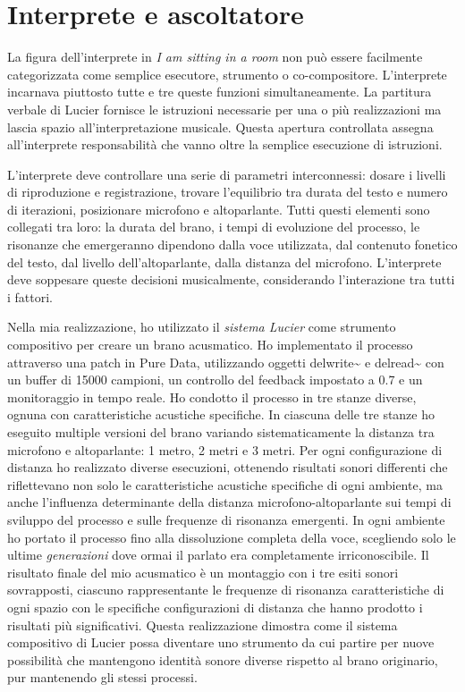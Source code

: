 
\section{Interprete e ascoltatore}
La figura dell'interprete in \textit{I am sitting in a room} non può essere facilmente categorizzata come semplice esecutore, strumento o co-compositore. L'interprete incarnava piuttosto tutte e tre queste funzioni simultaneamente. La partitura verbale di Lucier fornisce le istruzioni necessarie per una o più realizzazioni ma lascia spazio all'interpretazione musicale. Questa apertura controllata assegna all'interprete responsabilità che vanno oltre la semplice esecuzione di istruzioni.

L'interprete deve controllare una serie di parametri interconnessi: dosare i livelli di riproduzione e registrazione, trovare l'equilibrio tra durata del testo e numero di iterazioni, posizionare microfono e altoparlante. Tutti questi elementi sono collegati tra loro: la durata del brano, i tempi di evoluzione del processo, le risonanze che emergeranno dipendono dalla voce utilizzata, dal contenuto fonetico del testo, dal livello dell'altoparlante, dalla distanza del microfono. L'interprete deve soppesare queste decisioni musicalmente, considerando l'interazione tra tutti i fattori.

Nella mia realizzazione, ho utilizzato il \textit{sistema Lucier} come strumento compositivo per creare un brano acusmatico. Ho implementato il processo attraverso una patch in Pure Data, utilizzando oggetti delwrite\textasciitilde{} e delread\textasciitilde{} con un buffer di 15000 campioni, un controllo del feedback impostato a 0.7 e un monitoraggio in tempo reale. Ho condotto il processo in tre stanze diverse, ognuna con caratteristiche acustiche specifiche. In ciascuna delle tre stanze ho eseguito multiple versioni del brano variando sistematicamente la distanza tra microfono e altoparlante: 1 metro, 2 metri e 3 metri. Per ogni configurazione di distanza ho realizzato diverse esecuzioni, ottenendo risultati sonori differenti che riflettevano non solo le caratteristiche acustiche specifiche di ogni ambiente, ma anche l'influenza determinante della distanza microfono-altoparlante sui tempi di sviluppo del processo e sulle frequenze di risonanza emergenti. In ogni ambiente ho portato il processo fino alla dissoluzione completa della voce, scegliendo solo le ultime \textit{generazioni} dove ormai il parlato era completamente irriconoscibile. Il risultato finale del mio acusmatico è un montaggio con i tre esiti sonori sovrapposti, ciascuno rappresentante le frequenze di risonanza caratteristiche di ogni spazio con le specifiche configurazioni di distanza che hanno prodotto i risultati più significativi. Questa realizzazione dimostra come il sistema compositivo di Lucier possa diventare uno strumento da cui partire per nuove possibilità che mantengono identità sonore diverse rispetto al brano originario, pur mantenendo gli stessi processi.

